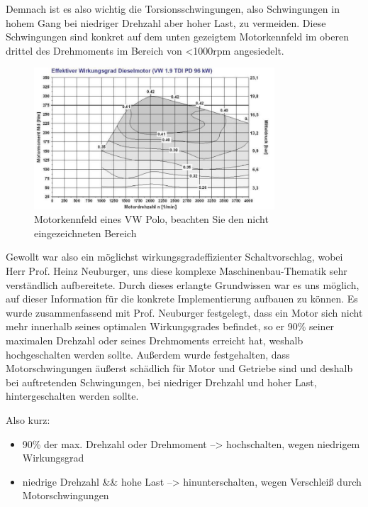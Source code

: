 Demnach ist es also wichtig die Torsionsschwingungen, also Schwingungen in hohem Gang bei niedriger Drehzahl aber hoher Last, zu vermeiden. Diese Schwingungen sind konkret auf dem unten gezeigtem Motorkennfeld im oberen drittel des Drehmoments im Bereich von <1000rpm angesiedelt.

\begin{figure}[!htb]\centering
	\includegraphics[width=0.8\textwidth]{images/poloMotorkennfeld}
	\caption{Motorkennfeld eines VW Polo, beachten Sie den nicht eingezeichneten Bereich \cite{SIMR.CH2-motorwirkungsgrad.SchwingungenMotorkennfeld}}\label{Fig:imgEngineVibrations}
\end{figure}

Gewollt war also ein möglichst wirkungsgradeffizienter Schaltvorschlag, wobei Herr Prof. Heinz Neuburger, uns diese komplexe Maschinenbau-Thematik sehr verständlich aufbereitete. Durch dieses erlangte Grundwissen war es uns  möglich, auf dieser Information für die konkrete Implementierung aufbauen zu können.
Es wurde zusammenfassend mit Prof. Neuburger festgelegt, dass ein Motor sich nicht mehr innerhalb seines optimalen  Wirkungsgrades befindet, so er 90\% seiner maximalen Drehzahl oder seines Drehmoments erreicht hat, weshalb hochgeschalten werden sollte. Außerdem wurde festgehalten, dass Motorschwingungen äußerst schädlich für Motor und Getriebe sind und deshalb bei auftretenden Schwingungen, bei niedriger Drehzahl und hoher Last, hintergeschalten werden sollte. 

Also kurz:
\begin{itemize}
	\item 90\% der max. Drehzahl oder Drehmoment --> hochschalten, wegen niedrigem Wirkungsgrad
	\item niedrige Drehzahl \&\& hohe Last --> hinunterschalten, wegen Verschleiß durch Motorschwingungen
\end{itemize}

\clearpage %